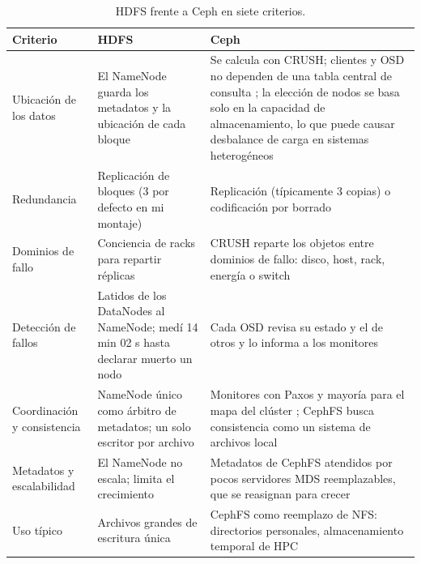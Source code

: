 \documentclass[11pt,a4paper]{article}
\begin{document}
\begin{table}[H]
\centering\footnotesize
\begin{tabularx}{\textwidth}{@{}>{\raggedright\arraybackslash}p{2.6cm}>{\raggedright\arraybackslash}X>{\raggedright\arraybackslash}X@{}}
\toprule
Criterio & HDFS & Ceph \\
\midrule
Ubicación de los datos & El NameNode guarda los metadatos y la ubicación de cada bloque \cite{HadoopHDFSDesign} & Se calcula con CRUSH; clientes y OSD no dependen de una tabla central de consulta \cite{CephArchitecture}; la elección de nodos se basa solo en la capacidad de almacenamiento, lo que puede causar desbalance de carga en sistemas heterogéneos \cite{Li2023} \\
Redundancia & Replicación de bloques (3 por defecto en mi montaje) & Replicación (típicamente 3 copias) o codificación por borrado \cite{Peters2021} \\
Dominios de fallo & Conciencia de racks para repartir réplicas \cite{HadoopHDFSDesign} & CRUSH reparte los objetos entre dominios de fallo: disco, host, rack, energía o switch \cite{Peters2021} \\
Detección de fallos & Latidos de los DataNodes al NameNode; medí 14 min 02 s hasta declarar muerto un nodo & Cada OSD revisa su estado y el de otros y lo informa a los monitores \cite{CephArchitecture} \\
Coordinación y consistencia & NameNode único como árbitro de metadatos; un solo escritor por archivo \cite{HadoopHDFSDesign} & Monitores con Paxos y mayoría para el mapa del clúster \cite{CephArchitecture}; CephFS busca consistencia como un sistema de archivos local \cite{Peters2021} \\
Metadatos y escalabilidad & El NameNode no escala; limita el crecimiento \cite{Dhulavvagol2023} & Metadatos de CephFS atendidos por pocos servidores MDS reemplazables, que se reasignan para crecer \cite{Peters2021} \\
Uso típico & Archivos grandes de escritura única & CephFS como reemplazo de NFS: directorios personales, almacenamiento temporal de HPC \cite{Peters2021} \\
\bottomrule
\end{tabularx}
\caption{HDFS frente a Ceph en siete criterios.}
\label{tab:comp}
\end{table}
\end{document}
